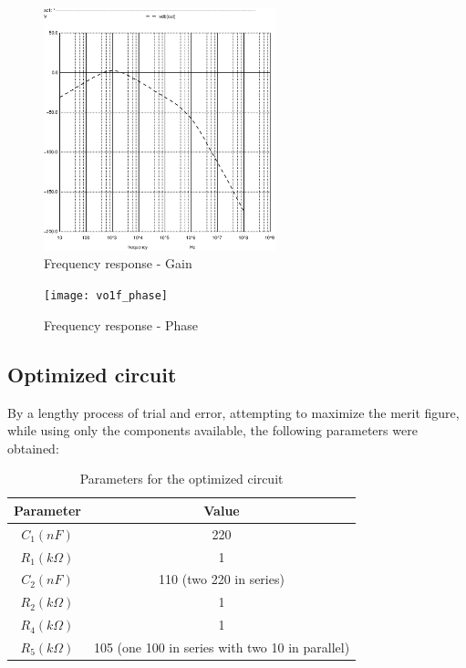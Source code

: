 \begin{figure}[H]
\centering
\includegraphics[width=0.6\textwidth]{vo1f}
\caption{Frequency response - Gain}
\end{figure}

\begin{figure}[H]
\centering
\texttt{[image: vo1f\_phase]}
\caption{Frequency response - Phase}
\end{figure}

\newpage

\subsection{Optimized circuit}

By a lengthy process of trial and error, attempting to maximize the merit figure, while using only the components available, the following parameters were obtained:

\begin{table}[H]
\centering
\begin{tabular}{|c|c|}
        \hline
        Parameter & Value \\
        \hline
        $C_1 (nF)$ & 220 \\
        $R_1 (k\Omega)$ & 1 \\
        $C_2 (nF)$ & 110 (two 220 in series) \\
        $R_2 (k\Omega)$ & 1 \\
        $R_4 (k\Omega)$ & 1 \\
        $R_5 (k\Omega)$ & 105 (one 100 in series with two 10 in parallel) \\
        \hline
\end{tabular}
\caption{Parameters for the optimized circuit}
\label{optimized_par}
\end{table}

